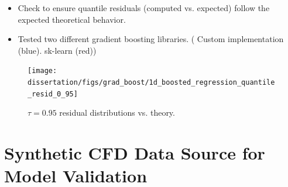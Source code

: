 \documentclass[t, pdftex]{beamer}
\begin{document}
\begin{frame}
\vspace{-8pt}
\begin{itemize}
    \item Check to ensure quantile residuals (computed vs. expected) follow the expected theoretical behavior.
    \item Tested two different gradient boosting libraries.  ({\color{utblue} Custom implementation  (blue)}. {\color{utred} sk-learn (red)})
\end{itemize}
\vspace{-8pt}

\begin{figure}
    \centering
    \texttt{[image: dissertation/figs/grad\_boost/1d\_boosted\_regression\_quantile\_resid\_0\_95]}\\
    \caption{\centering \scriptsize $\tau=0.95$ residual distributions vs. theory.}
\end{figure}
\end{frame}

\section[Synthetic Data]{Synthetic CFD Data Source for Model Validation}
\end{document}
